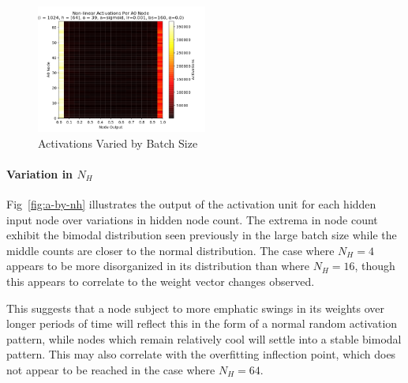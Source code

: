 \documentclass[10pt,epsf]{article}
\begin{document}
{{\begin{figure}[H]
      \includegraphics[width=0.5\textwidth]{./img/64-0.001-160-0-sigmoid-1/activations-A0-255.png}
      \caption{Activations Varied by Batch Size}
      \label{fig:a-by-b}
    \end{figure}
    \paragraph{Variation in $N_H$}{
      Fig~\ref{fig:a-by-nh} illustrates the output of the activation unit for each hidden input node
      over variations in hidden node count. The extrema in node count exhibit the bimodal distribution
      seen previously in the large batch size while the middle counts are closer to the normal
      distribution. The case where $N_H = 4$ appears to be more disorganized in its distribution
      than where $N_H = 16$, though this appears to correlate to the weight vector changes observed.

      This suggests that a node subject to more emphatic swings in its weights over longer periods of
      time will reflect this in the form of a normal random activation pattern, while nodes which remain
      relatively cool will settle into a stable bimodal pattern. This may also correlate with
      the overfitting inflection point, which does not appear to be reached in the case where $N_H = 64$.

}}}
\end{document}
